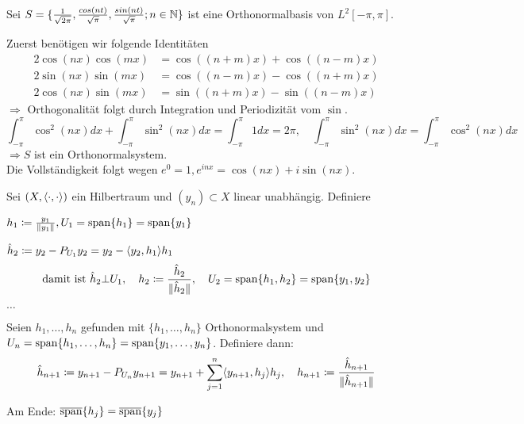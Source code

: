 \begin{beispiel}
	Sei $S = \{ \frac{1}{\sqrt{2 \pi}}, \frac{cos(nt)}{\sqrt{\pi}}, \frac{sin(nt)}{\sqrt{\pi}}; n \in \mathbb{N} \}$ ist eine Orthonormalbasis von $L^{2}[-\pi, \pi]$.	
\end{beispiel}

\begin{beweis}
	Zuerst benötigen wir folgende Identitäten
	\begin{align*}
		2 \cos(nx) \cos(mx) & = \cos((n + m) x) + \cos( (n - m) x) \\
		2 \sin(nx) \sin(mx) & = \cos((n - m) x) - \cos( (n + m) x) \\
		2 \cos(nx) \sin(mx) & = \sin((n + m) x) - \sin( (n - m) x) 
	\end{align*}
	$\Rightarrow$ Orthogonalität folgt durch Integration und Periodizität vom $\sin$.
	\[ \int_{-\pi}^{\pi} \cos^{2}(nx) dx + \int_{-\pi}^{\pi} \sin^{2}(nx) dx = \int_{-\pi}^{\pi} 1 dx = 2 \pi, \quad \int_{-\pi}^{\pi} \sin^{2}(nx) dx = \int_{-\pi}^{\pi} \cos^{2}(nx) dx \]
	$\Rightarrow S$ ist ein Orthonormalsystem. \\
	Die Vollständigkeit folgt wegen $e^{0} = 1, e^{inx} = \cos(nx) + i \sin(nx)$.
\end{beweis}


\begin{anwendung} 
	Sei $(X, \langle \cdot, \cdot \rangle)$ ein Hilbertraum und $(y_{n}) \subset X$ linear unabhängig. Definiere
	\begin{description}
		\item $h_{1} \coloneqq \frac{y_{1}}{\| y_{1} \|}, U_{1} = \operatorname{span} \{ h_{1} \} = \operatorname{span} \{ y_{1} \}$
		\item $\hat{h}_{2} \coloneqq y_{2} - P_{U_{1}} y_{2} = y_{2} - \langle y_{2} , h_{1} \rangle h_{1}$
			\[ \text{damit ist } \hat{h}_{2} \bot U_{1}, \quad h_{2} \coloneqq \frac{\hat{h}_{2}}{\| \hat{h}_{2} \|}, \quad U_{2} = \operatorname{span} \{ h_{1}, h_{2} \} = \operatorname{span} \{ y_{1}, y_{2} \} \]
		\item $\dotsc$
		\item Seien $h_{1}, \dotsc, h_{n}$ gefunden mit $\{ h_{1}, \dotsc, h_{n} \}$ Orthonormalsystem und $U_{n} = \operatorname{span} \{ h_{1}, \dotsc, h_{n} \} = \operatorname{span} \{ y_{1}, \dotsc, y_{n} \}$. Definiere dann:
			\[ \hat{h}_{n + 1} \coloneqq y_{n + 1} - P_{U_{n}} y_{n + 1 } = y_{n + 1} + \sum_{j = 1}^{n} \langle y_{n + 1} , h_{j} \rangle h_{j}, \quad h_{n + 1} \coloneqq \frac{\hat{h}_{n + 1}}{\| \hat{h}_{n + 1} \|} \]
	\end{description}
	Am Ende: $\overline{\operatorname{span}}\{ h_{j} \} = \overline{\operatorname{span}}\{ y_{j} \}$
\end{anwendung}


